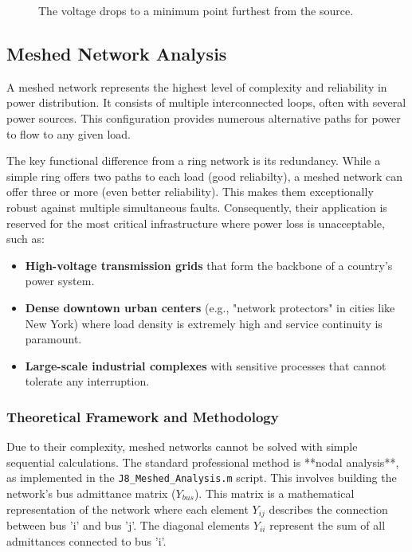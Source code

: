 \documentclass[12pt, a4paper]{article}
\begin{document}
\begin{figure}[htbp]
    \centering
    \caption{The voltage drops to a minimum point furthest from the source.}
    \label{fig:ring_profile}
\end{figure}

\subsection{Meshed Network Analysis}
A meshed network represents the highest level of complexity and reliability in power distribution. It consists of multiple interconnected loops, often with several power sources. This configuration provides numerous alternative paths for power to flow to any given load.

The key functional difference from a ring network is its redundancy. While a simple ring offers two paths to each load (good reliabilty), a meshed network can offer three or more (even better reliability). This makes them exceptionally robust against multiple simultaneous faults. Consequently, their application is reserved for the most critical infrastructure where power loss is unacceptable, such as:
\begin{itemize}
    \item \textbf{High-voltage transmission grids} that form the backbone of a country's power system.
    \item \textbf{Dense downtown urban centers} (e.g., "network protectors" in cities like New York) where load density is extremely high and service continuity is paramount.
    \item \textbf{Large-scale industrial complexes} with sensitive processes that cannot tolerate any interruption.
\end{itemize}

\subsubsection{Theoretical Framework and Methodology}
Due to their complexity, meshed networks cannot be solved with simple sequential calculations. The standard professional method is **nodal analysis**, as implemented in the \texttt{J8\_Meshed\_Analysis.m} script. This involves building the network's bus admittance matrix ($Y_{bus}$). This matrix is a mathematical representation of the network where each element $Y_{ij}$ describes the connection between bus 'i' and bus 'j'. The diagonal elements $Y_{ii}$ represent the sum of all admittances connected to bus 'i'.
\end{document}
